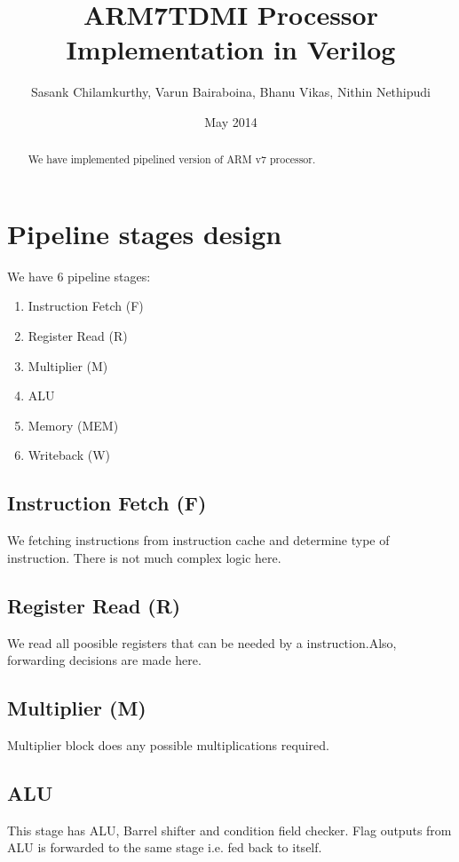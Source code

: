 \documentclass[a4paper]{article}
\title{ARM7TDMI Processor Implementation in Verilog}
\author{Sasank Chilamkurthy, Varun Bairaboina, Bhanu Vikas, Nithin Nethipudi}
\date{May 2014}
\begin{document}
\maketitle

\begin{abstract}
We have implemented pipelined version of ARM v7 processor.
\end{abstract}



\section{Pipeline stages design}
We have 6 pipeline stages: 

\begin{enumerate}
	\item Instruction Fetch (F) 
	
	\item Register Read (R)

	\item Multiplier (M)

	\item ALU 

	\item Memory (MEM)

	\item Writeback (W)

\end{enumerate}

	\subsection{Instruction Fetch (F)} 
		We fetching instructions from instruction cache and determine type of instruction. There is not much complex logic here.
	
	\subsection{Register Read (R)} 
		We read all poosible registers that can be needed by a instruction.Also, forwarding decisions are made here.

	\subsection{Multiplier (M)}
		Multiplier block does any possible multiplications required.

	\subsection{ALU} 
		This stage has ALU, Barrel shifter and condition field checker.
		Flag outputs from ALU is forwarded to the same stage
		i.e. fed back to itself.
\end{document}

